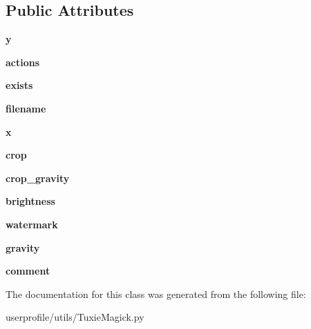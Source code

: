 \subsection*{Public Attributes}
\begin{DoxyCompactItemize}
\item 
\hypertarget{classTuxieMagick_1_1Image_a869c210408a5d38caedae0af11881ae7}{{\bfseries y}}\label{classTuxieMagick_1_1Image_a869c210408a5d38caedae0af11881ae7}

\item 
\hypertarget{classTuxieMagick_1_1Image_a9ac81563f80471cb72c876c6efe3760b}{{\bfseries actions}}\label{classTuxieMagick_1_1Image_a9ac81563f80471cb72c876c6efe3760b}

\item 
\hypertarget{classTuxieMagick_1_1Image_a106d5f78b78f9b7a056ae2e0b02cf55c}{{\bfseries exists}}\label{classTuxieMagick_1_1Image_a106d5f78b78f9b7a056ae2e0b02cf55c}

\item 
\hypertarget{classTuxieMagick_1_1Image_aec4121b223f91670059fd7b89580bf38}{{\bfseries filename}}\label{classTuxieMagick_1_1Image_aec4121b223f91670059fd7b89580bf38}

\item 
\hypertarget{classTuxieMagick_1_1Image_a62a2e410de8a1ea33666fc481bdd94c8}{{\bfseries x}}\label{classTuxieMagick_1_1Image_a62a2e410de8a1ea33666fc481bdd94c8}

\item 
\hypertarget{classTuxieMagick_1_1Image_a4bec606cd129562b58c0d4b3c0832c26}{{\bfseries crop}}\label{classTuxieMagick_1_1Image_a4bec606cd129562b58c0d4b3c0832c26}

\item 
\hypertarget{classTuxieMagick_1_1Image_af34f76d3a20622688e85b0bf5d02134a}{{\bfseries crop\-\_\-gravity}}\label{classTuxieMagick_1_1Image_af34f76d3a20622688e85b0bf5d02134a}

\item 
\hypertarget{classTuxieMagick_1_1Image_ad8c08e95ea7c3089fc2aee1e9b08f772}{{\bfseries brightness}}\label{classTuxieMagick_1_1Image_ad8c08e95ea7c3089fc2aee1e9b08f772}

\item 
\hypertarget{classTuxieMagick_1_1Image_a7b787c25d3b1f5f810725dcc74787f3c}{{\bfseries watermark}}\label{classTuxieMagick_1_1Image_a7b787c25d3b1f5f810725dcc74787f3c}

\item 
\hypertarget{classTuxieMagick_1_1Image_a920643fdf9b4936a25e288123ff144c1}{{\bfseries gravity}}\label{classTuxieMagick_1_1Image_a920643fdf9b4936a25e288123ff144c1}

\item 
\hypertarget{classTuxieMagick_1_1Image_a3577be4eb5ffaf5fcc734ef48dfea6e2}{{\bfseries comment}}\label{classTuxieMagick_1_1Image_a3577be4eb5ffaf5fcc734ef48dfea6e2}

\end{DoxyCompactItemize}


The documentation for this class was generated from the following file\-:\begin{DoxyCompactItemize}
\item 
userprofile/utils/Tuxie\-Magick.\-py\end{DoxyCompactItemize}
